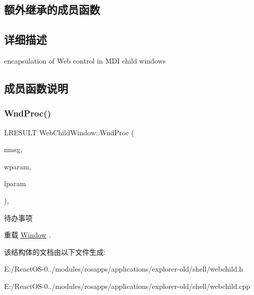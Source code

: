 \subsection*{额外继承的成员函数}


\subsection{详细描述}
encapsulation of Web control in M\+DI child windows 

\subsection{成员函数说明}
\mbox{\label{struct_web_child_window_a2f4af4c8464073f0e569d878eec1db69}} 
\subsubsection{\texorpdfstring{Wnd\+Proc()}{WndProc()}}
{\footnotesize\ttfamily L\+R\+E\+S\+U\+LT Web\+Child\+Window\+::\+Wnd\+Proc (\begin{DoxyParamCaption}\item[{U\+I\+NT}]{nmsg,  }\item[{W\+P\+A\+R\+AM}]{wparam,  }\item[{L\+P\+A\+R\+AM}]{lparam }\end{DoxyParamCaption})\hspace{0.3cm}{\ttfamily [protected]}, {\ttfamily [virtual]}}

\begin{DoxyRefDesc}{待办事项}
\item[\hyperlink{todo__todo000050}{待办事项}]\end{DoxyRefDesc}


重载 \hyperlink{struct_window}{Window} .



该结构体的文档由以下文件生成\+:\begin{DoxyCompactItemize}
\item 
E\+:/\+React\+O\+S-\/0../modules/rosapps/applications/explorer-\/old/shell/webchild.\+h\item 
E\+:/\+React\+O\+S-\/0../modules/rosapps/applications/explorer-\/old/shell/webchild.\+cpp\end{DoxyCompactItemize}
